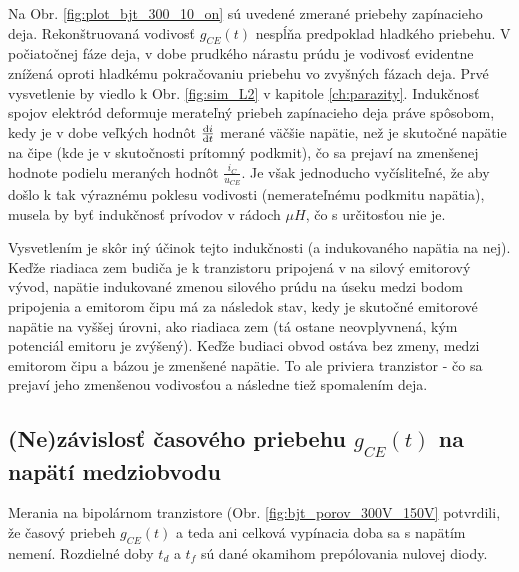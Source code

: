 Na Obr. \ref{fig:plot_bjt_300_10_on} sú uvedené zmerané priebehy zapínacieho deja. Rekonštruovaná vodivosť $g_{CE}(t)$ nespĺňa predpoklad hladkého priebehu. V počiatočnej fáze deja, v dobe prudkého nárastu prúdu je vodivosť evidentne znížená oproti hladkému pokračovaniu priebehu vo zvyšných fázach deja. Prvé vysvetlenie by viedlo k Obr. \ref{fig:sim_L2} v kapitole \ref{ch:parazity}. Indukčnosť spojov elektród deformuje merateľný priebeh zapínacieho deja práve spôsobom, kedy je v dobe veľkých hodnôt $\frac{\mathrm{d} i}{\mathrm{d} t}$ merané väčšie napätie, než je skutočné napätie na čipe (kde je v skutočnosti prítomný podkmit), čo sa prejaví na zmenšenej hodnote podielu meraných hodnôt $\frac{i_C}{u_{CE}}$. Je však jednoducho vyčísliteľné, že aby došlo k tak výraznému poklesu vodivosti (nemerateľnému podkmitu napätia), musela by byť indukčnosť prívodov v rádoch $\mu H$, čo s určitosťou nie je.

Vysvetlením je skôr iný účinok tejto indukčnosti (a indukovaného napätia na nej). Keďže riadiaca zem budiča je k tranzistoru pripojená v na silový emitorový vývod, napätie indukované zmenou silového prúdu na úseku medzi bodom pripojenia a emitorom čipu má za následok stav, kedy je skutočné emitorové napätie na vyššej úrovni, ako riadiaca zem (tá ostane neovplyvnená, kým potenciál emitoru je zvýšený). Keďže budiaci obvod ostáva bez zmeny, medzi emitorom čipu a bázou je zmenšené napätie. To ale priviera tranzistor - čo sa prejaví jeho zmenšenou vodivosťou a následne tiež spomalením deja.








\subsection{(Ne)závislosť časového priebehu $g_{CE}(t)$ na napätí medziobvodu}
Merania na bipolárnom tranzistore (Obr. \ref{fig:bjt_porov_300V_150V} potvrdili, že časový priebeh $g_{CE}(t)$ a teda ani celková vypínacia doba sa s napätím nemení. Rozdielné doby $t_d$ a $t_f$ sú dané okamihom prepólovania nulovej diody.


